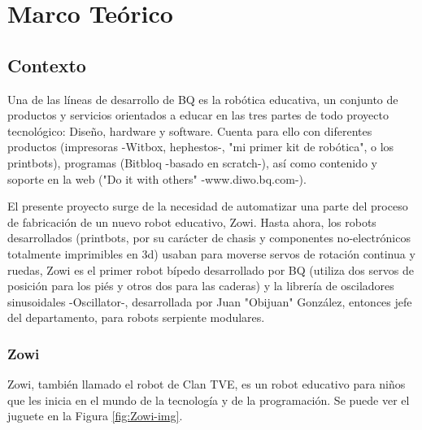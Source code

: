 
\chapter{Marco Teórico} %

\label{Chapter2} %


\section{Contexto}

Una de las líneas de desarrollo de BQ es la robótica educativa, un conjunto de productos y servicios orientados a educar en las tres partes de todo proyecto tecnológico: Diseño, hardware y software. Cuenta para ello con diferentes productos (impresoras -Witbox, hephestos-, "mi primer kit de robótica", o los printbots), programas (Bitbloq -basado en scratch-), así como contenido y soporte en la web ("Do it with others" -www.diwo.bq.com-).

El presente proyecto surge de la necesidad de automatizar una parte del proceso de fabricación de un nuevo robot educativo, Zowi. Hasta ahora, los robots desarrollados (printbots, por su carácter de chasis y componentes no-electrónicos totalmente imprimibles en 3d) usaban para moverse servos de rotación continua y ruedas, Zowi es el primer robot bípedo desarrollado por BQ (utiliza dos servos de posición para los piés y otros dos para las caderas) y la librería de osciladores sinusoidales -Oscillator-, desarrollada por Juan "Obijuan" González, entonces jefe del departamento, para robots serpiente modulares.

\subsection{Zowi}
Zowi, también llamado el robot de Clan TVE, es un robot educativo para niños que les inicia en el mundo de la tecnología y de la programación. Se puede ver el juguete en la Figura \ref{fig:Zowi-img}.

